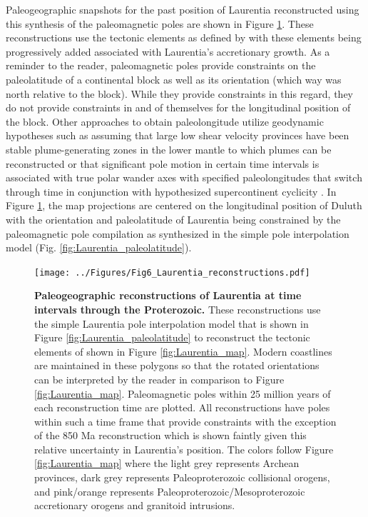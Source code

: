 \documentclass[twocolumn, switch]{article} %
\begin{document}
Paleogeographic snapshots for the past position of Laurentia reconstructed using this synthesis of the paleomagnetic poles are shown in Figure \ref{fig:Laurentia_reconstructions}. These reconstructions use the tectonic elements as defined by \citet{Whitmeyer2007a} with these elements being progressively added associated with Laurentia's accretionary growth. As a reminder to the reader, paleomagnetic poles provide constraints on the paleolatitude of a continental block as well as its orientation (which way was north relative to the block). While they provide constraints in this regard, they do not provide constraints in and of themselves for the longitudinal position of the block. Other approaches to obtain paleolongitude utilize geodynamic hypotheses such as assuming that large low shear velocity provinces have been stable plume-generating zones in the lower mantle to which plumes can be reconstructed \citep{Torsvik2014a} or that significant pole motion in certain time intervals is associated with true polar wander axes with specified paleolongitudes that switch through time in conjunction with hypothesized supercontinent cyclicity \citep{Mitchell2012a}. In Figure \ref{fig:Laurentia_reconstructions}, the map projections are centered on the longitudinal position of Duluth with the orientation and paleolatitude of Laurentia being constrained by the paleomagnetic pole compilation as synthesized in the simple pole interpolation model (Fig. \ref{fig:Laurentia_paleolatitude}).

\begin{figure}[!h]
\centering
\texttt{[image: ../Figures/Fig6\_Laurentia\_reconstructions.pdf]}
\caption{\textbf{Paleogeographic reconstructions of Laurentia at time intervals through the Proterozoic.} These reconstructions use the simple Laurentia pole interpolation model that is shown in Figure \ref{fig:Laurentia_paleolatitude} to reconstruct the tectonic elements of \cite{Whitmeyer2007a} shown in Figure \ref{fig:Laurentia_map}. Modern coastlines are maintained in these polygons so that the rotated orientations can be interpreted by the reader in comparison to Figure \ref{fig:Laurentia_map}. Paleomagnetic poles within 25 million years of each reconstruction time are plotted. All reconstructions have poles within such a time frame that provide constraints with the exception of the 850 Ma reconstruction which is shown faintly given this relative uncertainty in Laurentia's position. The colors follow Figure \ref{fig:Laurentia_map} where the light grey represents Archean provinces, dark grey represents Paleoproterozoic collisional orogens, and pink/orange represents Paleoproterozoic/Mesoproterozoic accretionary orogens and granitoid intrusions.}
\label{fig:Laurentia_reconstructions}
\end{figure}
\end{document}
